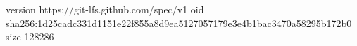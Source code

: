 version https://git-lfs.github.com/spec/v1
oid sha256:1d25cadc331d1151e22f855a8d9ea5127057179e3e4b1bac3470a58295b172b0
size 128286
